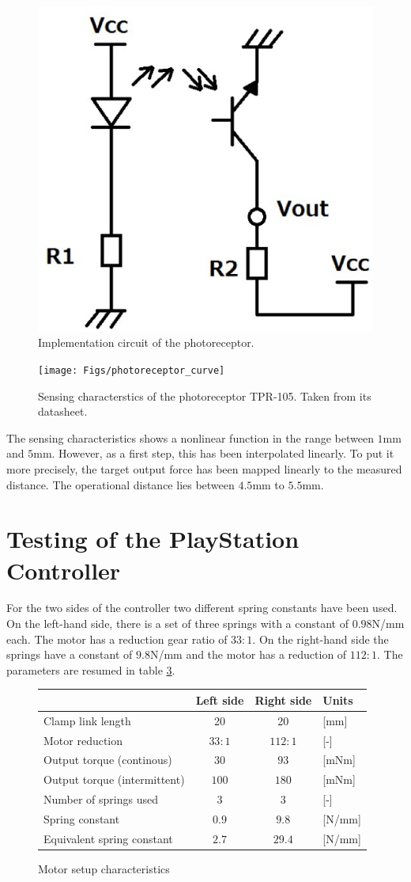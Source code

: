 	\begin{figure}[h!]
		\centering
		\includegraphics[width=0.2\linewidth]{Figs/tpr105_circuit}
		\caption{Implementation circuit of the photoreceptor.}
		\label{fig:tpr105_circuit}
	\end{figure}
	\begin{figure}[h!]
		\centering
		\texttt{[image: Figs/photoreceptor\_curve]}
		\caption{Sensing characterstics of the photoreceptor TPR-105. Taken from its datasheet.}
		\label{fig:photoreceptor_curve}
	\end{figure}

	The sensing characteristics shows a nonlinear function in the range between $1$mm and $5$mm. However, as a first step, this has been interpolated linearly. To put it more precisely, the target output force has been mapped linearly to the measured distance. The operational distance lies between $4.5$mm to $5.5$mm.
	
	\section{Testing of the PlayStation Controller}
	For the two sides of the controller two different spring constants have been used. On the left-hand side, there is a set of three springs with a constant of $0.98$N/mm each. The motor has a reduction gear ratio of $33:1$. On the right-hand side the springs have a constant of $9.8 $N/mm and the motor has a reduction of $112:1$. The parameters are resumed in table \ref{tab:playstation_charac}.
	
	\begin{figure}[h!]
		\centering
		\begin{tabular}{|l|c|c|l|}
			\hline
			& Left side & Right side & Units\\ \hline \hline
			Clamp link length & 20 &  20 & [mm]  \\ \hline
			Motor reduction & $33:1$ & $112:1$ &  [-] \\ \hline
			Output torque (continous) & $30$ & $93$ & [mNm]  \\ \hline
			Output torque (intermittent) & $100$ & $180$ & [mNm] \\ \hline
			Number of springs used & $3$ & $3$ & [-] \\ \hline
			Spring constant & $0.9$ & $9.8$ & [N/mm] \\ \hline
			Equivalent spring constant & $2.7$ & $29.4$ & [N/mm] \\ \hline
		\end{tabular}
		\caption{Motor setup characteristics}
		\label{tab:playstation_charac}
	\end{figure}

